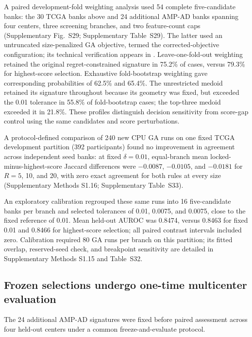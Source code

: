 A paired development-fold weighting analysis used 54 complete five-candidate banks: the 30 TCGA banks above and 24 additional AMP-AD banks spanning four centers, three screening branches, and two feature-count caps (Supplementary Fig.~S29; Supplementary Table~S29). The latter used an untruncated size-penalized GA objective, termed the corrected-objective configuration; its technical verification appears in . Leave-one-fold-out weighting retained the original regret-constrained signature in 75.2\% of cases, versus 79.3\% for highest-score selection. Exhaustive fold-bootstrap weighting gave corresponding probabilities of 62.5\% and 65.4\%. The unrestricted medoid retained its signature throughout because its geometry was fixed, but exceeded the 0.01 tolerance in 55.8\% of fold-bootstrap cases; the top-three medoid exceeded it in 21.8\%. These profiles distinguish decision sensitivity from score-gap control using the same candidates and score perturbations.

A protocol-defined comparison of 240 new CPU GA runs on one fixed TCGA development partition (392 participants) found no improvement in agreement across independent seed banks: at fixed $\delta=0.01$, equal-branch mean locked-minus-highest-score Jaccard differences were $-0.0087$, $-0.0105$, and $-0.0181$ for $R=5$, 10, and 20, with zero exact agreement for both rules at every size (Supplementary Methods S1.16; Supplementary Table~S33).

An exploratory calibration regrouped these same runs into 16 five-candidate banks per branch and selected tolerances of 0.01, 0.0075, and 0.0075, close to the fixed reference of 0.01. Mean held-out AUROC was 0.8474, versus 0.8463 for fixed 0.01 and 0.8466 for highest-score selection; all paired contrast intervals included zero. Calibration required 80 GA runs per branch on this partition; its fitted overlap, reserved-seed check, and breakpoint sensitivity are detailed in Supplementary Methods S1.15 and Table~S32.

\subsection{Frozen selections undergo one-time multicenter evaluation}

The 24 additional AMP-AD signatures were fixed before paired assessment across four held-out centers under a common freeze-and-evaluate protocol.

